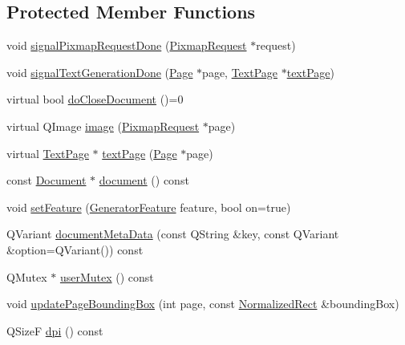 \subsection*{Protected Member Functions}
\begin{DoxyCompactItemize}
\item 
void \hyperlink{classOkular_1_1Generator_abed0ea73d02be9c4a0afcd920882faf5}{signal\+Pixmap\+Request\+Done} (\hyperlink{classOkular_1_1PixmapRequest}{Pixmap\+Request} $\ast$request)
\item 
void \hyperlink{classOkular_1_1Generator_a512593e4a09f861ea2009a4a5c0d03b5}{signal\+Text\+Generation\+Done} (\hyperlink{classOkular_1_1Page}{Page} $\ast$page, \hyperlink{classOkular_1_1TextPage}{Text\+Page} $\ast$\hyperlink{classOkular_1_1Generator_af7915b97ab4b9347fb76babdda212cef}{text\+Page})
\item 
virtual bool \hyperlink{classOkular_1_1Generator_ad3f1dcb98f3bd87c87ad0e91ecf4a6d7}{do\+Close\+Document} ()=0
\item 
virtual Q\+Image \hyperlink{classOkular_1_1Generator_a6712c8d3c2759c3a1fcacbd503d3286e}{image} (\hyperlink{classOkular_1_1PixmapRequest}{Pixmap\+Request} $\ast$page)
\item 
virtual \hyperlink{classOkular_1_1TextPage}{Text\+Page} $\ast$ \hyperlink{classOkular_1_1Generator_af7915b97ab4b9347fb76babdda212cef}{text\+Page} (\hyperlink{classOkular_1_1Page}{Page} $\ast$page)
\item 
const \hyperlink{classOkular_1_1Document}{Document} $\ast$ \hyperlink{classOkular_1_1Generator_a4248672ef04e62660d51f16c0a862bbe}{document} () const 
\item 
void \hyperlink{classOkular_1_1Generator_abcebcc5f69e98b6227496198a5c69d2c}{set\+Feature} (\hyperlink{classOkular_1_1Generator_a8517096896273a5ba5b970be09313c77}{Generator\+Feature} feature, bool on=true)
\item 
Q\+Variant \hyperlink{classOkular_1_1Generator_a450f3316a563dcf217fcebac4fa0328e}{document\+Meta\+Data} (const Q\+String \&key, const Q\+Variant \&option=Q\+Variant()) const 
\item 
Q\+Mutex $\ast$ \hyperlink{classOkular_1_1Generator_a83d702cccbce2288c3258d97f1f15e19}{user\+Mutex} () const 
\item 
void \hyperlink{classOkular_1_1Generator_acc2aae181c392cb58e42eaa8d35213ef}{update\+Page\+Bounding\+Box} (int page, const \hyperlink{classOkular_1_1NormalizedRect}{Normalized\+Rect} \&bounding\+Box)
\item 
Q\+Size\+F \hyperlink{classOkular_1_1Generator_ad3dd14822e3f5c9d1785008a207f34fb}{dpi} () const 
\end{DoxyCompactItemize}


